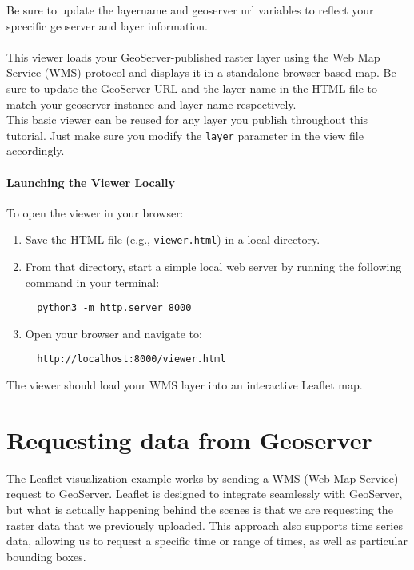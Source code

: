 \documentclass{article}
\begin{document}
Be sure to update the layername and geoserver url variables to reflect your spcecific geoserver and layer information. \\ \\
This viewer loads your GeoServer-published raster layer using the Web Map Service (WMS) protocol and displays it in a standalone browser-based map. Be sure to update the GeoServer URL and the layer name in the HTML file to match your geoserver instance and layer name respectively.\\

This basic viewer can be reused for any layer you publish throughout this tutorial. Just make sure you modify the \texttt{layer} parameter in the view file  accordingly.

\paragraph{Launching the Viewer Locally}

To open the viewer in your browser:

\begin{enumerate}
  \item Save the HTML file (e.g., \texttt{viewer.html}) in a local directory.
  \item From that directory, start a simple local web server by running the following command in your terminal:
  \begin{verbatim}
  python3 -m http.server 8000
  \end{verbatim}
  \item Open your browser and navigate to:
  \begin{verbatim}
  http://localhost:8000/viewer.html
  \end{verbatim}
\end{enumerate}

The viewer should load your WMS layer into an interactive Leaflet map.

\section{Requesting data from Geoserver}

The Leaflet visualization example works by sending a WMS (Web Map Service) request to GeoServer. Leaflet is designed to integrate seamlessly with GeoServer, but what is actually happening behind the scenes is that we are requesting the raster data that we previously uploaded. This approach also supports time series data, allowing us to request a specific time or range of times, as well as particular bounding boxes. \\
\end{document}

